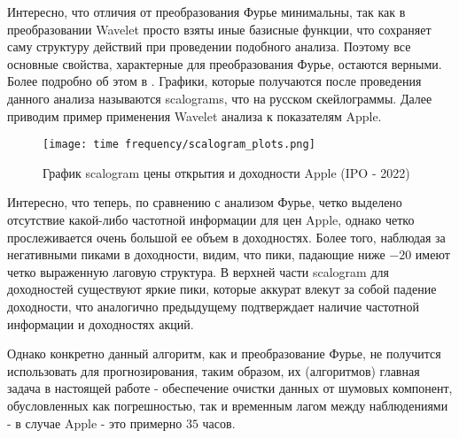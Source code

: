Интересно, что отличия от преобразования Фурье минимальны, так как в преобразовании Wavelet просто взяты иные базисные функции, что сохраняет саму структуру действий при проведении подобного анализа. Поэтому все основные свойства, характерные для преобразования Фурье, остаются верными. Более подробно об этом в \cite{brunton2022data}. Графики, которые получаются после проведения данного анализа называются scalograms, что на русском скейлограммы. Далее приводим пример применения Wavelet анализа к показателям Apple.
\begin{figure}[H]
	\centering
	\texttt{[image: time frequency/scalogram\_plots.png]}
	\caption{График scalogram цены открытия и доходности Apple (IPO - 2022)}
	\label{fig::wavelet_example}
\end{figure}
Интересно, что теперь, по сравнению с анализом Фурье, четко выделено отсутствие какой-либо частотной информации для цен Apple, однако четко прослеживается очень большой ее объем в доходностях. Более того, наблюдая за негативными пиками в доходности, видим, что пики, падающие ниже $-20$ имеют четко выраженную лаговую структура. В верхней части scalogram для доходностей существуют яркие пики, которые аккурат влекут за собой падение доходности, что аналогично предыдущему подтверждает наличие частотной информации и доходностях акций.

Однако конкретно данный алгоритм, как и преобразование Фурье, не получится использовать для прогнозирования, таким образом, их (алгоритмов) главная задача в настоящей работе - обеспечение очистки данных от шумовых компонент, обусловленных как погрешностью, так и временным лагом между наблюдениями - в случае Apple - это примерно $35$ часов.

